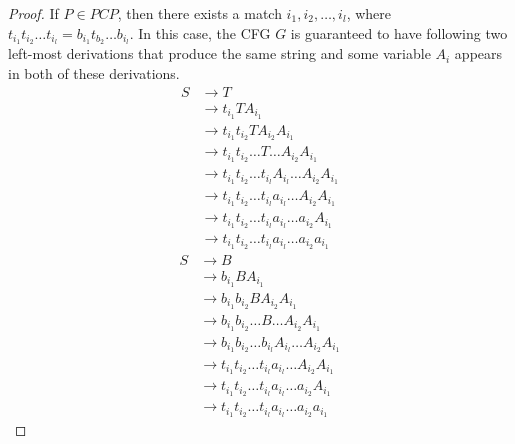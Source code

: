 \documentclass[11pt]{article}
\begin{document}
\begin{proof}
If $P \in PCP$, then there exists a match $i_1, i_2,\dots,i_l$, where $t_{i_{1}}t_{i_{2}} \dots t_{i_{l}} = b_{i_{1}}t_{b_{2}} \dots b_{i_{l}}$. In this case, the CFG $G$ is guaranteed to have following two left-most derivations that produce the same string and some variable $A_i$ appears in both of these derivations.
\begin{align*}
S &\rightarrow T \\
&\rightarrow t_{i_{1}}TA_{i_{1}} \\
&\rightarrow t_{i_{1}} t_{i_{2}} T A_{i_{2}} A_{i_{1}} \\
&\rightarrow t_{i_{1}} t_{i_{2}} \dots T \dots A_{i_{2}} A_{i_{1}} \\
&\rightarrow t_{i_{1}} t_{i_{2}} \dots t_{i_{l}}A_{i_{l}} \dots A_{i_{2}} A_{i_{1}} \\
&\rightarrow t_{i_{1}} t_{i_{2}} \dots t_{i_{l}}a_{i_{l}} \dots A_{i_{2}} A_{i_{1}} \\
&\rightarrow t_{i_{1}} t_{i_{2}} \dots t_{i_{l}}a_{i_{l}} \dots a_{i_{2}} A_{i_{1}} \\
&\rightarrow t_{i_{1}} t_{i_{2}} \dots t_{i_{l}}a_{i_{l}} \dots a_{i_{2}} a_{i_{1}}
\end{align*}
\begin{align*}
S &\rightarrow B \\
&\rightarrow b_{i_{1}}B A_{i_{1}} \\
&\rightarrow b_{i_{1}} b_{i_{2}} B A_{i_{2}} A_{i_{1}} \\
&\rightarrow b_{i_{1}} b_{i_{2}} \dots B \dots A_{i_{2}} A_{i_{1}} \\
&\rightarrow b_{i_{1}} b_{i_{2}} \dots b_{i_{l}}A_{i_{l}} \dots A_{i_{2}} A_{i_{1}} \\
&\rightarrow t_{i_{1}} t_{i_{2}} \dots t_{i_{l}}a_{i_{l}} \dots A_{i_{2}} A_{i_{1}} \\
&\rightarrow t_{i_{1}} t_{i_{2}} \dots t_{i_{l}}a_{i_{l}} \dots a_{i_{2}} A_{i_{1}} \\
&\rightarrow t_{i_{1}} t_{i_{2}} \dots t_{i_{l}}a_{i_{l}} \dots a_{i_{2}} a_{i_{1}}
\end{align*}
\end{proof}
\end{document}
